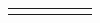 \documentclass[letterpaper]{article}
\begin{document}
\begin{figure}[hbp]
\begin{minipage}{12.1146in}
\begin{flushleft}
\begin{supertabular}{|m{0.8913598in}|m{1.0997599in}|m{3.3018599in}|m{0.8809598in}|m{0.6198598in}|m{4.84626in}|}
{%
%
}
\end{supertabular}
\end{flushleft}
\end{minipage}
\end{figure}
\end{document}
